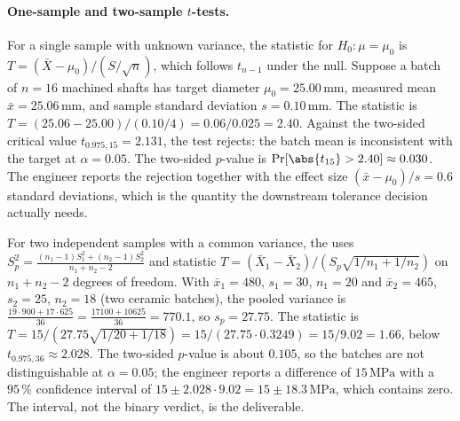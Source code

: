 \paragraph{One-sample and two-sample $t$-tests.} For a single
sample with unknown variance, the statistic for $H_{0}: \mu =
\mu_{0}$ is $T = (\bar{X} - \mu_{0})/(S/\sqrt{n})$, which follows
$t_{n-1}$ under the null. Suppose a batch of $n = 16$ machined
shafts has target diameter $\mu_{0} = 25.00\,\si{\milli\meter}$,
measured mean $\bar{x} = 25.06\,\si{\milli\meter}$, and sample
standard deviation $s = 0.10\,\si{\milli\meter}$. The statistic is
$T = (25.06 - 25.00)/(0.10/4) = 0.06/0.025 = 2.40$. Against the
two-sided critical value $t_{0.975, 15} = 2.131$, the test rejects:
the batch mean is inconsistent with the target at $\alpha = 0.05$.
The two-sided $p$-value is $\Pr[\abs{t_{15}} > 2.40] \approx
0.030$. The engineer reports the rejection together with the effect
size $(\bar{x} - \mu_{0})/s = 0.6$ standard deviations, which is the
quantity the downstream tolerance decision actually needs.

For two independent samples with a common variance, the
 uses $S_{p}^{2} =
\frac{(n_{1}-1)S_{1}^{2} + (n_{2}-1)S_{2}^{2}}{n_{1} + n_{2} - 2}$
and statistic $T = (\bar{X}_{1} - \bar{X}_{2})/(S_{p}\sqrt{1/n_{1}
+ 1/n_{2}})$ on $n_{1} + n_{2} - 2$ degrees of freedom. With
$\bar{x}_{1} = 480$, $s_{1} = 30$, $n_{1} = 20$ and $\bar{x}_{2} =
465$, $s_{2} = 25$, $n_{2} = 18$ (two ceramic batches), the pooled
variance is $\frac{19 \cdot 900 + 17 \cdot 625}{36} = \frac{17100
+ 10625}{36} = 770.1$, so $s_{p} = 27.75$. The statistic is
$T = 15/(27.75\sqrt{1/20 + 1/18}) = 15/(27.75 \cdot 0.3249) =
15/9.02 = 1.66$, below $t_{0.975, 36} \approx 2.028$. The two-sided
$p$-value is about $0.105$, so the batches are not distinguishable
at $\alpha = 0.05$; the engineer reports a difference of $15\,
\si{\mega\pascal}$ with a $95\,\%$ confidence interval of $15 \pm
2.028 \cdot 9.02 = 15 \pm 18.3\,\si{\mega\pascal}$, which contains
zero. The interval, not the binary verdict, is the deliverable.


